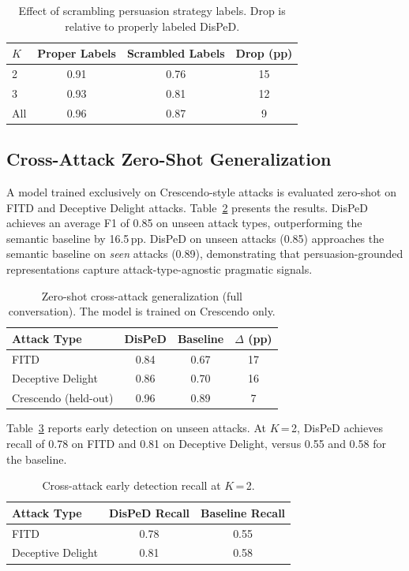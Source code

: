\documentclass[11pt,a4paper]{article}
\begin{document}
\begin{table}[t]
\centering
\caption{Effect of scrambling persuasion strategy labels. Drop is relative to properly labeled DisPeD.}
\label{tab:scrambled}
\begin{tabular}{lccc}
\toprule
\textbf{$K$} & \textbf{Proper Labels} & \textbf{Scrambled Labels} & \textbf{Drop (pp)} \\
\midrule
2 & 0.91 & 0.76 & 15 \\
3 & 0.93 & 0.81 & 12 \\
All & 0.96 & 0.87 & 9 \\
\bottomrule
\end{tabular}
\end{table}

\subsection{Cross-Attack Zero-Shot Generalization}
\label{sec:cross_attack}

A model trained exclusively on Crescendo-style attacks is evaluated zero-shot on FITD and Deceptive Delight attacks. Table~\ref{tab:cross_attack} presents the results. DisPeD achieves an average F1 of 0.85 on unseen attack types, outperforming the semantic baseline by 16.5\,pp. DisPeD on unseen attacks (0.85) approaches the semantic baseline on \emph{seen} attacks (0.89), demonstrating that persuasion-grounded representations capture attack-type-agnostic pragmatic signals.

\begin{table}[t]
\centering
\caption{Zero-shot cross-attack generalization (full conversation). The model is trained on Crescendo only.}
\label{tab:cross_attack}
\begin{tabular}{lccc}
\toprule
\textbf{Attack Type} & \textbf{DisPeD} & \textbf{Baseline} & \textbf{$\Delta$ (pp)} \\
\midrule
FITD & 0.84 & 0.67 & 17 \\
Deceptive Delight & 0.86 & 0.70 & 16 \\
Crescendo (held-out) & 0.96 & 0.89 & 7 \\
\bottomrule
\end{tabular}
\end{table}

Table~\ref{tab:cross_attack_k2} reports early detection on unseen attacks. At $K$\,=\,2, DisPeD achieves recall of 0.78 on FITD and 0.81 on Deceptive Delight, versus 0.55 and 0.58 for the baseline.

\begin{table}[t]
\centering
\caption{Cross-attack early detection recall at $K$\,=\,2.}
\label{tab:cross_attack_k2}
\begin{tabular}{lcc}
\toprule
\textbf{Attack Type} & \textbf{DisPeD Recall} & \textbf{Baseline Recall} \\
\midrule
FITD & 0.78 & 0.55 \\
Deceptive Delight & 0.81 & 0.58 \\
\bottomrule
\end{tabular}
\end{table}
\end{document}
